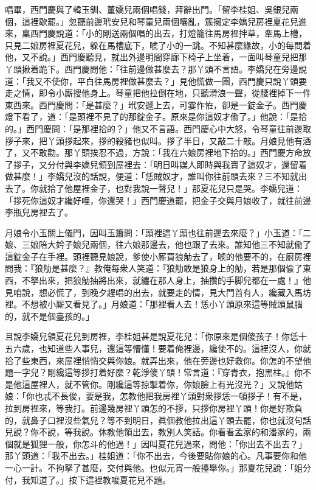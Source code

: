 唱畢，西門慶與了韓玉釧、董嬌兒兩個唱錢，拜辭出門。「留李桂姐、吳銀兒兩個，這裡歇罷。」忽聽前邊玳安兒和琴童兒兩個嚷亂，簇擁定李嬌兒房裡夏花兒進來，稟西門慶說道：「小的剛送兩個唱的出去，打燈籠往馬房裡拌草，牽馬上槽，只見二娘房裡夏花兒，躲在馬槽底下，唬了小的一跳。不知甚麼緣故，小的每問着他，又不說。」西門慶聽見，就出外邊明間穿廊下椅子上坐着，一面叫琴童兒把那丫頭揪着跪下。西門慶問他：「往前邊做甚麼去？那丫頭不言語。李嬌兒在旁邊說道：「我又不使你，平白往馬房裡做甚麼去？」見他慌做一團，西門慶只說丫頭要走之情，即令小厮搜他身上。琴童把他拉倒在地，只聽滑浪一聲，從腰裡掉下一件東西來。西門慶問：「是甚麼？」玳安遞上去，可霎作恠，卻是一錠金子。西門慶燈下看了，道：「是頭裡不見了的那錠金子。原來是你這奴才偸了。」他說：「是拾的。」西門慶問：「是那裡拾的？」他又不言語。西門慶心中大怒，令琴童往前邊取拶子來，把丫頭拶起來，拶的殺豬也似叫。拶了半日，又敲二十敲。月娘見他有酒了，又不敢勸。那丫頭挨忍不過，方說：「我在六娘房裡地下拾的。」西門慶方命放了拶子，又分付與李嬌兒領到屋裡去：「明日叫媒人即時與我賣了這奴才，還留着做甚麼！」李嬌兒沒的話說，便道：「恁賊奴才，誰叫你往前頭去來？三不知就出去了。你就拾了他屋裡金子，也對我說一聲兒！」{}那夏花兒只是哭。李嬌兒道：「拶死你這奴才纔好哩，你還哭！」西門慶道罷，把金子交與月娘收了，就往前邊李瓶兒房裡去了。

月娘令小玉關上儀門，因叫玉簫問：「頭裡這丫頭也往前邊去來麼？」小玉道：「二娘、三娘陪大妗子娘兒兩個，往六娘那邊去，他也跟了去來。誰知他三不知就偸了這錠金子在手裡。頭裡聽見娘說，爹使小厮買狼觔去了，唬的他要不的，在廚房裡問我：『狼觔是甚麼？』教俺每衆人笑道：『狼觔敢是狼身上的觔，若是那個偸了東西，不拏出來，把狼觔抽將出來，就纏在那人身上，抽攢的手脚兒都在一處！』他見咱說，想必慌了，到晚夕趕唱的出去，就要走的情，見大門首有人，纔藏入馬坊裡。不想被小厮又看見了。」月娘道：「那裡看人去！恁小丫頭原來這等賊頭鼠腦的，就不是個臺孩的。」

且說李嬌兒領夏花兒到房裡，李桂姐甚是說夏花兒：「你原來是個傻孩子！你恁十五六歲，也知道些人事兒，還這等懵懂！要着俺裡邊，纔使不的。這裡沒人，你就拾了些東西，來屋裡悄悄交與你娘。就弄出來，他在旁邊也好救你。你怎的不望他題一字兒？剛纔這等拶打着好麼？乾淨傻丫頭！常言道：『穿青衣，抱黑柱。』你不是他這屋裡人，就不管你。剛纔這等掠掣着你，你娘臉上有光沒光？」又說他姑娘：「你也忒不長俊，要是我，怎教他把我房裡丫頭對衆拶恁一頓拶子！有不是，拉到房裡來，等我打。前邊幾房裡丫頭怎的不拶，只拶你房裡丫頭！你是好欺負的，就鼻子口裡沒些氣兒？等不到明日，眞個教他拉出這丫頭去罷，你也就沒句話兒說？你不說，等我說。休教他領出去，教別人笑話。你看看孟家的和潘家的，兩個就是狐狸一般，你怎斗的他過！」因叫夏花兒過來，問他：「你出去不出去？」那丫頭道：「我不出去。」桂姐道：「你不出去，今後要貼你娘的心。凡事要你和他一心一計。不拘拏了甚麼，交付與他。也似元宵一般擡舉你。」那夏花兒說：「姐分付，我知道了。」按下這裡教唆夏花兒不題。

